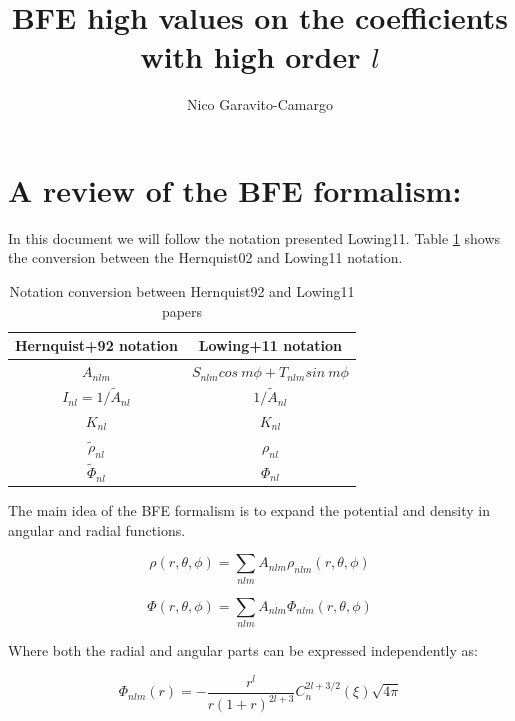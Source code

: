 \documentclass[14pt]{article}
\title{BFE high values on the coefficients with high order $l$}
\author{Nico Garavito-Camargo}
\begin{document}
\maketitle

\section{A review of the BFE formalism:}

In this document we will follow the notation presented Lowing11. Table
\ref{tab:conversion} shows the conversion between the Hernquist02 and Lowing11
notation.

\begin{table}[h]
  \centering
  \begin{tabular}{c  c}
    \hline
    \hline
    Hernquist+92 notation & Lowing+11 notation \\
    \hline
    $A_{nlm}$ & $S_{nlm} cos\ m\phi + T_{nlm}sin\ m\phi $\\
    $I_{nl} = 1/\tilde{A}_{nl}$ & $1/\tilde{A}_{nl}$\\
    $K_{nl}$ & $K_{nl}$ \\
    $\tilde{\rho}_{nl}$ & $\rho_{nl}$\\
    $\tilde{\Phi}_{nl}$ & $\Phi_{nl}$\\
    \hline
    \hline
  \end{tabular}
  \caption{Notation conversion between Hernquist92 and Lowing11
  papers}\label{tab:conversion}
\end{table}



The main idea of the BFE formalism is to expand the potential and density in
angular and radial functions. 




\begin{equation}
    \rho(r, \theta, \phi) = \sum_{nlm} A_{nlm}\rho_{nlm}(r, \theta, \phi)
\end{equation}

\begin{equation}
    \Phi(r, \theta, \phi) = \sum_{nlm} A_{nlm}\Phi_{nlm}(r, \theta, \phi)
\end{equation}

Where both the radial and angular parts can be expressed independently as:


\begin{equation}
  \Phi_{nlm}(r) = - \dfrac{r^l}{r(1+r)^{2l+3}}C_{n}^{2l+3/2}(\xi)\sqrt{4\pi}
\end{equation}
\end{document}
